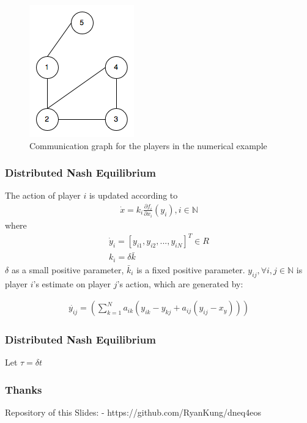 \documentclass[notheorems, aspectratio=54]{beamer}
\begin{document}
\begin{frame}
  \begin{figure}[H]
    \centering
    \includegraphics[width=0.3\linewidth]{nodes.png}
    \caption{Communication graph for the players in the numerical example}
  \end{figure}
\end{frame}

\begin{frame}
  \frametitle{Distributed Nash Equilibrium}

  The action of player $i$ is updated according to\newline
  \begin{gather}
    \dot{x} = k_i \frac {\partial f_i}{\partial x_i}(y_i), i \in \mathbb{N} 
  \end{gather}
  where
   \begin{gather}
     \dot{y}_i = [y_{i1}, y_{i2},...,y_{iN}]^T \in R \nonumber \\
     k_i = \delta \bar{k} \nonumber
   \end{gather}
   $\delta$ as a small positive parameter, $\bar{k}_i$ is a fixed positive parameter.\newline
   $y_{ij}, \forall i, j \in \mathbb{N}$ is player $i$'s estimate on player $j$'s action, which are generated by:\newline

   \begin{gather}
     \dot{y_{ij}}=\left(\sum_{k=1}^N a_{ik}(y_{ik}-y_{kj}+a_{ij}(y_{ij}-x_y))\right) \nonumber
   \end{gather}

\end{frame}

\begin{frame}
  \frametitle{Distributed Nash Equilibrium}
  Let $\tau=\delta t$

  

\end{frame}


\begin{frame}
  \frametitle{Thanks}
  Repository of this Slides:\newline
  - https://github.com/RyanKung/dneq4eos \quad
\end{frame}
\end{document}
